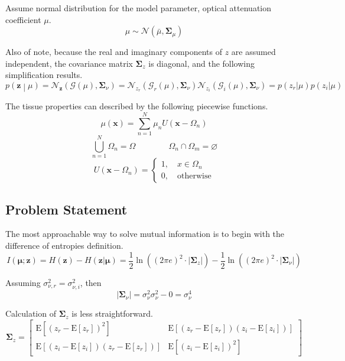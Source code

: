 \documentclass{article}         %
\theoremstyle{definition}
\theoremstyle{remark}
\newcommand{\eq}[1]{\begin{equation} #1 \end{equation}}
\newcommand{\xbf}{\mathbf{x}}
\newcommand{\zbf}{\mathbf{z}}
\newcommand{\mubf}{\boldsymbol{\mu}}
\newcommand{\zcond}{\mathbf{z}\middle|\mu}
\newcommand{\Gscript}{\mathcal{G}}
\newcommand{\Nscript}{\mathcal{N}}
\newcommand{\paren}[1]{\left(#1\right)}
\newcommand{\arr}[2]{\begin{array}{#1} #2 \end{array}}
\newcommand{\expect}[1]{\mathrm{E}\left[#1\right]}
\newcommand{\sumnn}{\sum\limits_{n=1}^N}
\newcommand{\qq}{\qquad\qquad}
\begin{document}
Assume normal distribution for the model parameter, optical attenuation coefficient $\mu$.
\begin{equation}
	\mu\sim\mathcal{N}\left(\bar{\mu},\mathbf{\Sigma}_\mu\right)
\end{equation}

Also of note, because the real and imaginary components of $z$ are assumed independent, the covariance matrix $\mathbf{\Sigma}_z$ is diagonal, and the following simplification results.
\eq{p\paren{\zcond} = \Nscript_\zbf\paren{\Gscript\paren{\mu},\mathbf{\Sigma}_\nu} = \Nscript_{z_r}\paren{\Gscript_r\paren{\mu},\mathbf{\Sigma}_\nu}
\Nscript_{z_i}\paren{\Gscript_i\paren{\mu},\mathbf{\Sigma}_\nu} = p\paren{z_r|\mu}p\paren{z_i|\mu}}

The tissue properties can described by the following piecewise functions.
\eq{\mu\paren{\xbf} = \sumnn\mu_nU\paren{\xbf-\Omega_n}}
\eq{\bigcup_{n=1}^N\Omega_n = \Omega \qq \Omega_n\cap\Omega_m = \varnothing}
\eq{U\paren{\xbf-\Omega_n} = \left\{\arr{l}{1, \quad x\in\Omega_n \\ 0, \quad \mathrm{otherwise}}\right.}

\subsection{Problem Statement}\label{Problem Statement}

The most approachable way to solve mutual information is to begin with the difference of entropies definition.
\begin{equation}
	I\left(\mubf;\zbf\right) = H\left(\zbf\right) - H\left(\zbf|\mubf\right) 
	= \frac{1}{2}\ln\left(\left(2\pi e\right)^2\cdot\lvert\mathbf{\Sigma}_z\rvert\right) - \frac{1}{2}\ln\left(\left(2\pi e\right)^2\cdot\lvert\mathbf{\Sigma}_\nu\rvert\right)
\end{equation}

Assuming $\sigma_{\nu,r}^2=\sigma_{\nu,i}^2$, then
\eq{\lvert\mathbf{\Sigma}_\nu\rvert = \sigma_\nu^2\sigma_\nu^2-0 = \sigma_\nu^4}

Calculation of $\mathbf{\Sigma}_z$ is less straightforward.
\begin{equation}
	\mathbf{\Sigma}_z = \left[ \begin{array}{cc}
	\mathrm{E}\left[\left(z_r - \expect{z_r}\right)^2\right] & \mathrm{E}\left[\left(z_r - \expect{z_r}\right)\left(z_i - \expect{z_i}\right)\right] \\
	\mathrm{E}\left[\left(z_i - \expect{z_i}\right)\left(z_r - \expect{z_r}\right)\right] & \mathrm{E}\left[\left(z_i - \expect{z_i}\right)^2\right] \end{array} \right]
\end{equation}
\end{document}
